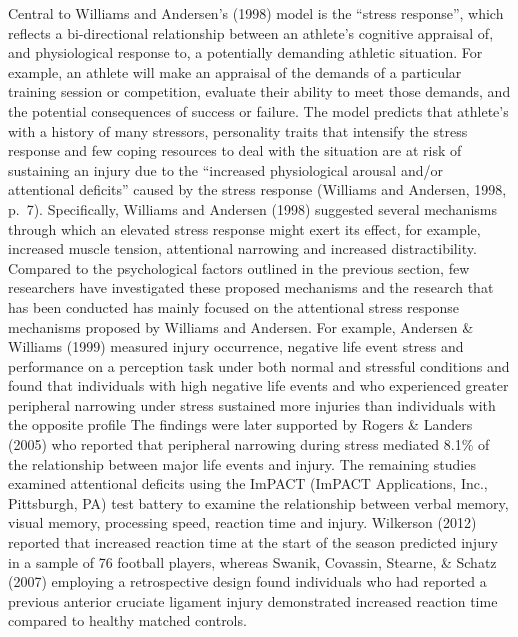 \documentclass[
  english,
  man,floatsintext]{apa6}
\begin{document}
Central to Williams and Andersen's (1998) model is the \enquote{stress response}, which reflects a bi-directional relationship between an athlete's cognitive appraisal of, and physiological response to, a potentially demanding athletic situation.
For example, an athlete will make an appraisal of the demands of a particular training session or competition, evaluate their ability to meet those demands, and the potential consequences of success or failure.
The model predicts that athlete's with a history of many stressors, personality traits that intensify the stress response and few coping resources to deal with the situation are at risk of sustaining an injury due to the \enquote{increased physiological arousal and/or attentional deficits} caused by the stress response (Williams and Andersen, 1998, p.~7).
Specifically, Williams and Andersen (1998) suggested several mechanisms through which an elevated stress response might exert its effect, for example, increased muscle tension, attentional narrowing and increased distractibility. Compared to the psychological factors outlined in the previous section, few researchers have investigated these proposed mechanisms and the research that has been conducted has mainly focused on the attentional stress response mechanisms proposed by Williams and Andersen.
For example, Andersen \& Williams (1999)
measured injury occurrence, negative life event stress and performance on a perception task under both normal and stressful conditions and found that individuals with high negative life events and who experienced greater peripheral narrowing under stress sustained more injuries than individuals with the opposite profile
The findings were later supported by Rogers \& Landers (2005)
who reported that peripheral narrowing during stress mediated 8.1\% of the relationship between major life events and injury.
The remaining studies examined attentional deficits using the ImPACT (ImPACT Applications, Inc., Pittsburgh, PA) test battery to examine the relationship between verbal memory, visual memory, processing speed, reaction time and injury. Wilkerson (2012)
reported that increased reaction time at the start of the season predicted injury in a sample of 76 football players, whereas Swanik, Covassin, Stearne, \& Schatz (2007)
employing a retrospective design found individuals who had reported a previous anterior cruciate ligament injury demonstrated increased reaction time compared to healthy matched controls.
\end{document}
